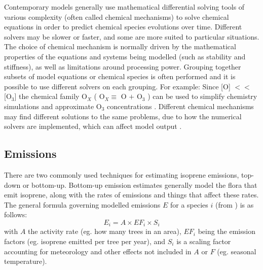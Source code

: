     Contemporary models generally use mathematical differential solving tools of various complexity (often called chemical mechanisms) to solve chemical equations in order to predict chemical species evolutions over time.
    Different solvers may be slower or faster, and some are more suited to particular situations.
    The choice of chemical mechanism is normally driven by the mathematical properties of the equations and systems being modelled (such as stability and stiffness), as well as limitations around processing power.
    Grouping together subsets of model equations or chemical species is often performed and it is possible to use different solvers on each grouping.
    For example: Since [O] $<<$ [O$_3$] the chemical family O$_X$ (  O$_X \equiv $ O $+$ O$_3$ ) can be used to simplify chemistry simulations and approximate O$_3$ concentrations \parencite[][Chapter 3]{BrasseurJacob2017}.
    Different chemical mechanisms may find different solutions to the same problems, due to how the numerical solvers are implemented, which can affect model output \parencite{Zhang2012}.
    
  
  \subsection{Emissions}
  
    There are two commonly used techniques for estimating isoprene emissions, top-down or bottom-up.
    Bottom-up emission estimates generally model the flora that emit isoprene, along with the rates of emissions and things that affect these rates.
    The general formula governing modelled emissions $E$ for a species $i$ (from \textcite{BrasseurJacob2017}) is as follows:
    \begin{equation*}
      E_i = A \times EF_i \times S_i
    \end{equation*}
    with $A$ the activity rate (eg. how many trees in an area), $EF_i$ being the emission factors (eg. isoprene emitted per tree per year), and $S_i$ is a scaling factor accounting for meteorology and other effects not included in $A$ or $F$ (eg. seasonal temperature).
    
